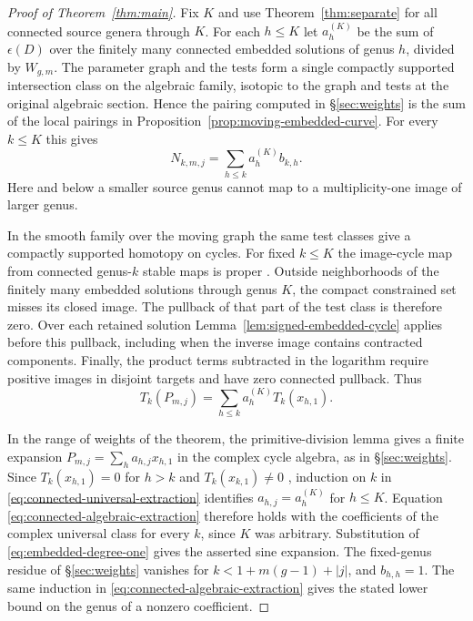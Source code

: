 \begin{proof}[Proof of Theorem~\ref{thm:main}]
Fix $K$ and use Theorem~\ref{thm:separate} for all connected source
genera through $K$. For each $h\le K$ let $a_h^{(K)}$ be the sum
of $\epsilon(D)$ over the finitely many connected embedded solutions
of genus $h$, divided by $W_{g,m}$. The parameter graph and the
tests form a single compactly supported intersection class on the
algebraic family, isotopic to the graph and tests at the original
algebraic section. Hence the pairing computed in
\S\ref{sec:weights} is the sum of the local pairings in
Proposition~\ref{prop:moving-embedded-curve}. For every $k\le K$
this gives
\begin{equation}\label{eq:connected-algebraic-extraction}
             N_{k,m,j}=\sum_{h\le k} a_h^{(K)} b_{k,h}.
\end{equation}
Here and below a smaller source genus cannot map to a
multiplicity-one image of larger genus.

In the smooth family over the moving graph the same test classes
give a compactly supported homotopy on cycles. For fixed $k\le K$
the image-cycle map from connected genus-$k$ stable maps is proper
\cite[\S5]{WueProduct}. Outside neighborhoods of the finitely many
embedded solutions through genus $K$, the compact constrained set
misses its closed image. The pullback of that part of the test
class is therefore zero. Over each retained solution
Lemma~\ref{lem:signed-embedded-cycle} applies before this
pullback, including when the inverse image contains contracted
components. Finally, the product terms subtracted in the logarithm
require positive images in disjoint targets and have zero connected
pullback. Thus
\begin{equation}\label{eq:connected-universal-extraction}
          T_k(P_{m,j})=\sum_{h\le k} a_h^{(K)}T_k(x_{h,1}).
\end{equation}

In the range of weights of the theorem, the primitive-division
lemma gives a finite expansion $P_{m,j}=\sum_h a_{h,j}x_{h,1}$
in the complex cycle algebra, as in \S\ref{sec:weights}. Since
$T_k(x_{h,1})=0$ for $h>k$ and $T_k(x_{k,1})\ne0$
\cite[\S\S5--6]{WueProduct}, induction on $k$ in
\eqref{eq:connected-universal-extraction} identifies
$a_{h,j}=a_h^{(K)}$ for $h\le K$. Equation
\eqref{eq:connected-algebraic-extraction} therefore holds with the
coefficients of the complex universal class for every $k$, since
$K$ was arbitrary. Substitution of \eqref{eq:embedded-degree-one}
gives the asserted sine expansion. The fixed-genus residue of
\S\ref{sec:weights} vanishes for $k<1+m(g-1)+|j|$, and
$b_{h,h}=1$. The same induction in
\eqref{eq:connected-algebraic-extraction} gives the stated lower
bound on the genus of a nonzero coefficient.
\end{proof}
